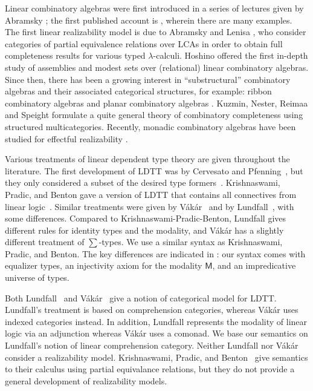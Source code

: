 \documentclass[a4paper,UKenglish,cleveref,numberwithinsect, autoref, thm-restate]{lipics-v2021}
\newcommand{\m}{\mathsf{M}}
\begin{document}
Linear combinatory algebras were first introduced in a series of lectures given by Abramsky \cite{Abramsky1997Interaction}; the first published account is \cite{AbramskyHaghverdiScott2002LCAs}, wherein there are many examples. The first linear realizability model is due to Abramsky and Lenisa \cite{AbramskyLenisa2005LinearRealizability}, who consider categories of partial equivalence relations over LCAs in order to obtain full completeness results for various typed $\lambda$-calculi. Hoshino \cite{hoshino:2007} offered the first in-depth study of assemblies and modest sets over (relational) linear combinatory algebras. Since then, there has been a growing interest in ``substructural'' combinatory algebras and their associated categorical structures, for example: ribbon combinatory algebras \cite{Hasegawa2021BraidedLambda,HasegawaLechenne2024Braids} and planar combinatory algebras \cite{Tomita2021RealizabilityWithoutSymmetry,Tomita2022PlanarRealizability,Tomita2023CategoricalRealizability}. Kuzmin, Nester, Reimaa and Speight \cite{KuzminNesterReimaaSpeight2025CombinatoryCompleteness} formulate a quite general theory of combinatory completeness using structured multicategories.
Recently, monadic combinatory algebras have been studied for effectful realizability \cite{cohen:2025a,cohen:2019,cohen:2025}.

Various treatments of linear dependent type theory are given throughout the literature.
The first development of LDTT was by Cervesato and Pfenning~\cite{cervesato1996linear,MR1946180},
but they only considered a subset of the desired type formers~\cite{MR1946180}.
Krishnaswami, Pradic, and Benton gave a version of LDTT
that contains all connectives from linear logic~\cite{DBLP:conf/popl/KrishnaswamiPB15}.
Similar treatments were given by V\'ak\'ar~\cite{vakar:2015}
and by Lundfall~\cite{lundfall:2017},
with some differences.
Compared to Krishnaswami-Pradic-Benton,
Lundfall gives different rules for identity types and the modality,
and V\'ak\'ar has a slightly different treatment of $\sum$-types.
We use a similar syntax as Krishnaswami, Pradic, and Benton.
The key differences are indicated in :
our syntax comes with equalizer types, an injectivity axiom for the modality $\m$, and an impredicative universe of types.

Both Lundfall~\cite{lundfall:2017} and  V\'ak\'ar~\cite{vakar:2015} give a notion of categorical model for LDTT.
Lundfall's treatment is based on comprehension categories,
whereas V\'ak\'ar uses indexed categories instead.
In addition,
Lundfall represents the modality of linear logic via an adjunction
whereas V\'ak\'ar uses a comonad.
We base our semantics on Lundfall's notion of linear comprehension category.
Neither Lundfall nor V\'ak\'ar consider a realizability model.
Krishnaswami, Pradic, and Benton~\cite{DBLP:conf/popl/KrishnaswamiPB15} give semantics to their calculus using partial equivalance relations,
but they do not provide a general development of realizability models.
\end{document}
